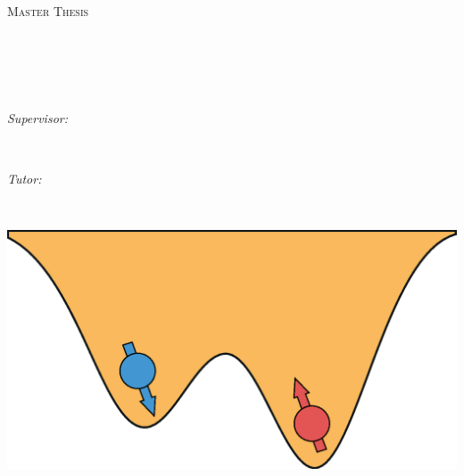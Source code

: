 \documentclass[
12pt, %
oneside, %
english, %
singlespacing, %
headsepline, %
consistentlayout, %
]{MastersDoctoralThesis} %
\author{David Fernández Fernández} %
\newcommand{\MYhref}[3][blue]{\href{#2}{\color{#1}{#3}}}
\begin{document}
\frontmatter %

\pagestyle{plain} %


\begin{titlepage}
\begin{center}

\vspace*{.06\textheight}
{\scshape\LARGE \univname\par}\vspace{1.5cm} %
\textsc{\Large Master Thesis}\\[0.5cm] %

\HRule \\[0.4cm] %
{\huge \bfseries \ttitle\par}\vspace{0.4cm} %
\HRule \\[1.5cm] %
 

\begin{minipage}[c]{\textwidth}
	\centering
	\LARGE
	\MYhref[black]{mailto:david.fernandezf03@estudiante.uam.es}{\authorname} %
\end{minipage}\\[1.0cm]
\begin{minipage}[c]{0.45\textwidth}
	\centering
	\large
	\emph{Supervisor:} \MYhref[black]{mailto:gplatero@icmm.csic.es}{\supname}\\ %
\end{minipage}\\[0.2cm]
\begin{minipage}[c]{0.45\textwidth}
	\centering
	\large
	\emph{Tutor:} \MYhref[black]{mailto:german.sierra@uam.es}{\examname}\\ %
\end{minipage}\\[0.6cm]


\vfill

\includegraphics[width=0.6\linewidth]{cover}\\ %


\end{center}
\end{titlepage}
\end{document}
